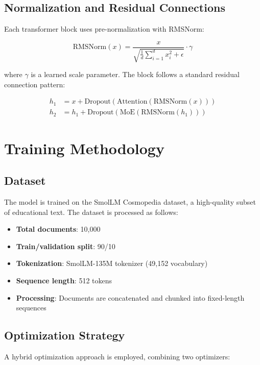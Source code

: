 \documentclass[11pt,a4paper]{article}
\begin{document}
\subsection{Normalization and Residual Connections}

Each transformer block uses pre-normalization with RMSNorm:

\begin{equation}
\text{RMSNorm}(x) = \frac{x}{\sqrt{\frac{1}{d}\sum_{i=1}^{d} x_i^2 + \epsilon}} \cdot \gamma
\end{equation}

where $\gamma$ is a learned scale parameter. The block follows a standard residual connection pattern:

\begin{align}
h_1 &= x + \text{Dropout}(\text{Attention}(\text{RMSNorm}(x))) \\
h_2 &= h_1 + \text{Dropout}(\text{MoE}(\text{RMSNorm}(h_1)))
\end{align}

\section{Training Methodology}

\subsection{Dataset}

The model is trained on the SmolLM Cosmopedia dataset, a high-quality subset of educational text. The dataset is processed as follows:

\begin{itemize}
    \item \textbf{Total documents}: 10,000
    \item \textbf{Train/validation split}: 90/10
    \item \textbf{Tokenization}: SmolLM-135M tokenizer (49,152 vocabulary)
    \item \textbf{Sequence length}: 512 tokens
    \item \textbf{Processing}: Documents are concatenated and chunked into fixed-length sequences
\end{itemize}

\subsection{Optimization Strategy}

A hybrid optimization approach is employed, combining two optimizers:
\end{document}
